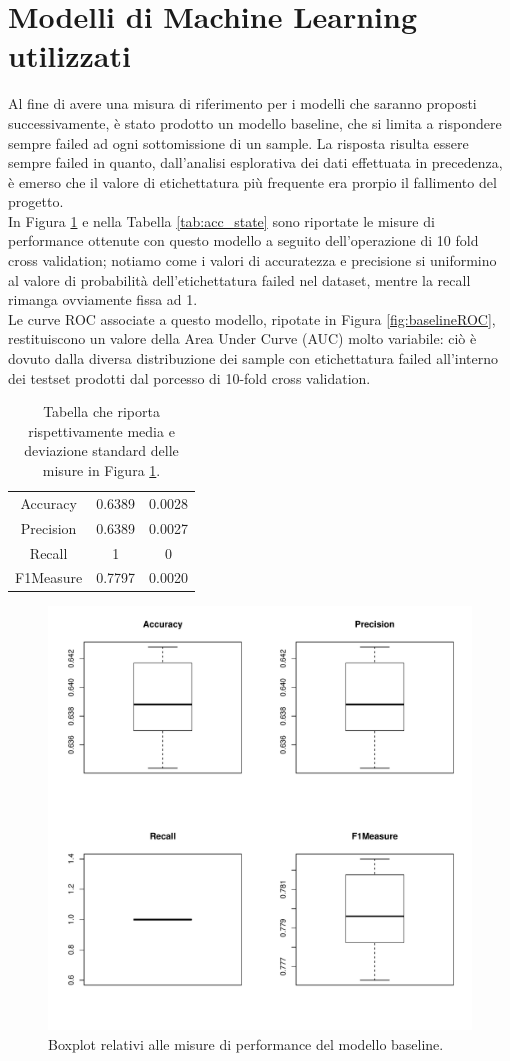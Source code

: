 \section{Modelli di Machine Learning utilizzati}
Al fine di avere una misura di riferimento per i modelli che saranno proposti successivamente, è stato prodotto un modello baseline, che si limita a rispondere sempre failed ad ogni sottomissione di un sample. La risposta risulta essere sempre failed in quanto, dall'analisi esplorativa dei dati effettuata in precedenza, è emerso che il valore di etichettatura più frequente era prorpio il fallimento del progetto.\\
In Figura \ref{fig:baselineperformance} e nella Tabella \ref{tab:acc_state} sono riportate le misure di performance ottenute con questo modello a seguito dell'operazione di 10 fold cross validation; notiamo come i valori di accuratezza e precisione si uniformino al valore di  probabilità dell'etichettatura failed nel dataset, mentre la recall rimanga ovviamente fissa ad 1.\\
Le curve ROC associate a questo modello, ripotate in Figura \ref{fig:baselineROC}, restituiscono un valore della Area Under Curve (AUC) molto variabile: ciò è dovuto dalla diversa distribuzione dei sample con etichettatura failed all'interno dei testset prodotti dal porcesso di 10-fold cross validation.
\begin{table}
	\caption{Tabella che riporta rispettivamente media e deviazione standard delle misure in Figura \ref{fig:baselineperformance}.}
	\label{tab:baselineperformance}
	\centering
	\begin{tabular}{c|c|c}
		Accuracy & 0.6389 & 0.0028 \\ 
		Precision & 0.6389 & 0.0027 \\
		Recall & 1 & 0 \\
		F1Measure & 0.7797 & 0.0020 \\
	\end{tabular}
\end{table} 
\begin{figure}
	\centering
	\includegraphics[width=0.7\linewidth]{../FinalResults/Baseline_performance}
	\caption{Boxplot relativi alle misure di performance del modello baseline.}
	\label{fig:baselineperformance}
\end{figure}

